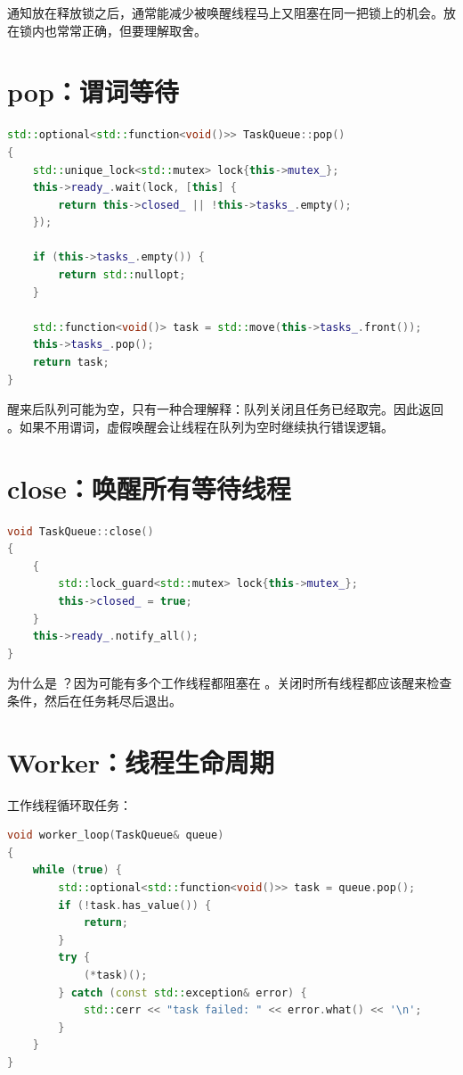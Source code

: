 通知放在释放锁之后，通常能减少被唤醒线程马上又阻塞在同一把锁上的机会。放在锁内也常常正确，但要理解取舍。

\section{pop：谓词等待}

\begin{lstlisting}[language=C++,caption={取任务}]
std::optional<std::function<void()>> TaskQueue::pop()
{
    std::unique_lock<std::mutex> lock{this->mutex_};
    this->ready_.wait(lock, [this] {
        return this->closed_ || !this->tasks_.empty();
    });

    if (this->tasks_.empty()) {
        return std::nullopt;
    }

    std::function<void()> task = std::move(this->tasks_.front());
    this->tasks_.pop();
    return task;
}
\end{lstlisting}

醒来后队列可能为空，只有一种合理解释：队列关闭且任务已经取完。因此返回 。如果不用谓词，虚假唤醒会让线程在队列为空时继续执行错误逻辑。

\section{close：唤醒所有等待线程}

\begin{lstlisting}[language=C++,caption={关闭队列}]
void TaskQueue::close()
{
    {
        std::lock_guard<std::mutex> lock{this->mutex_};
        this->closed_ = true;
    }
    this->ready_.notify_all();
}
\end{lstlisting}

为什么是 ？因为可能有多个工作线程都阻塞在 。关闭时所有线程都应该醒来检查条件，然后在任务耗尽后退出。

\section{Worker：线程生命周期}

工作线程循环取任务：

\begin{lstlisting}[language=C++,caption={工作线程循环}]
void worker_loop(TaskQueue& queue)
{
    while (true) {
        std::optional<std::function<void()>> task = queue.pop();
        if (!task.has_value()) {
            return;
        }
        try {
            (*task)();
        } catch (const std::exception& error) {
            std::cerr << "task failed: " << error.what() << '\n';
        }
    }
}
\end{lstlisting}


